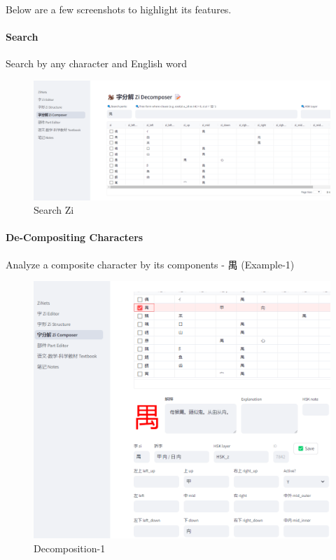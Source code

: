 \documentclass[
  11pt,
  letterpaper,
]{article}
\begin{document}
Below are a few screenshots to highlight its features.

\hypertarget{search}{%
\paragraph{Search}\label{search}}

Search by any character and English word

\begin{figure}
\centering
\includegraphics{./images/app_discover-zi-by-part.png}
\caption{Search Zi}
\end{figure}

\hypertarget{de-compositing-characters}{%
\paragraph{De-Compositing Characters}\label{de-compositing-characters}}

Analyze a composite character by its components - 禺 (Example-1)

\begin{figure}
\centering
\includegraphics{./images/app_zi-parts_1.png}
\caption{Decomposition-1}
\end{figure}
\end{document}
